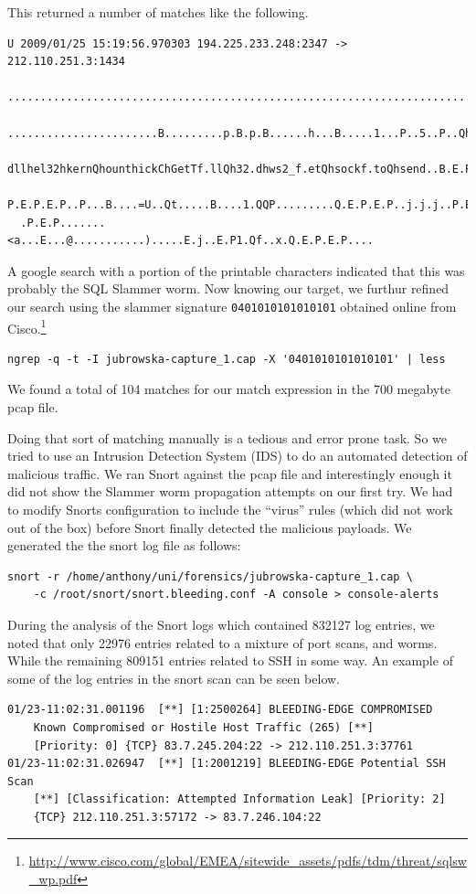 \documentclass[a4paper,
    11pt,
    normalheadings,
    parindent,
    UKenglish,
    abstracton,
    ]{scrartcl}
\begin{document}
This returned a number of matches like the following.
\begin{verbatim}
U 2009/01/25 15:19:56.970303 194.225.233.248:2347 -> 212.110.251.3:1434
  .......................................................................
  .......................B.........p.B.p.B......h...B.....1...P..5..P..Qh
  dllhel32hkernQhounthickChGetTf.llQh32.dhws2_f.etQhsockf.toQhsend..B.E.P
  P.E.P.E.P..P...B....=U..Qt.....B....1.QQP.........Q.E.P.E.P..j.j.j..P.E
  .P.E.P.......<a...E...@...........).....E.j..E.P1.Qf..x.Q.E.P.E.P....
\end{verbatim}
A google search with a portion of the printable characters indicated that this was probably the SQL Slammer worm.
Now knowing our target, we furthur refined our search using the slammer signature \texttt{0401010101010101} obtained online from Cisco.\footnote{\url{http://www.cisco.com/global/EMEA/sitewide_assets/pdfs/tdm/threat/sqlsw_wp.pdf}}

\begin{verbatim}
ngrep -q -t -I jubrowska-capture_1.cap -X '0401010101010101' | less
\end{verbatim}

We found a total of 104 matches for our match expression in the 700 megabyte pcap file.

Doing that sort of matching manually is a tedious and error prone task.
So we tried to use an Intrusion Detection System (IDS) to do an automated detection of malicious traffic.
We ran Snort against the pcap file and interestingly enough it did not show the Slammer worm propagation attempts on our first try.
We had to modify Snorts configuration to include the ``virus'' rules (which did not work out of the box) before Snort finally detected the malicious payloads. We generated the the snort log file as follows:

\begin{verbatim}
snort -r /home/anthony/uni/forensics/jubrowska-capture_1.cap \
    -c /root/snort/snort.bleeding.conf -A console > console-alerts
\end{verbatim}

During the analysis of the Snort logs which contained 832127 log entries, we noted that only 22976 entries related to a mixture of port scans, and worms.
While the remaining 809151 entries related to SSH in some way.
An example of some of the log entries in the snort scan can be seen below.

\begin{verbatim}
01/23-11:02:31.001196  [**] [1:2500264] BLEEDING-EDGE COMPROMISED
    Known Compromised or Hostile Host Traffic (265) [**]
    [Priority: 0] {TCP} 83.7.245.204:22 -> 212.110.251.3:37761
01/23-11:02:31.026947  [**] [1:2001219] BLEEDING-EDGE Potential SSH Scan
    [**] [Classification: Attempted Information Leak] [Priority: 2]
    {TCP} 212.110.251.3:57172 -> 83.7.246.104:22
\end{verbatim}
\end{document}
